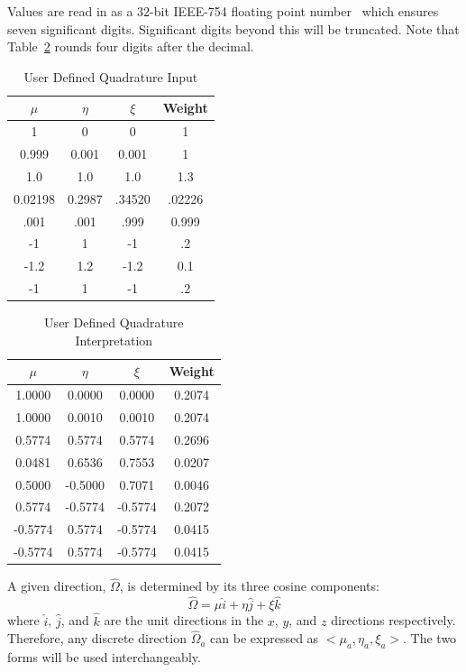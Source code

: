 Values are read in as a 32-bit IEEE-754 floating point number~\citep{ref:ieee754} which ensures seven significant digits. Significant digits beyond this will be truncated. Note that Table~\ref{tab:quad_interp} rounds four digits after the decimal.

\begin{table}[ht]
\caption{User Defined Quadrature Input}
\centering 
\begin{tabular}{c c c c}
\hline \hline   
$\mu$    & $\eta$ & $\xi$ & Weight\\ [0.5ex] 
\hline
1        & 0      & 0      & 1 \\
0.999    & 0.001  & 0.001  & 1 \\
1.0      & 1.0    & 1.0    & 1.3 \\
0.02198  & 0.2987 & .34520 & .02226 \\
.001     & .001   & .999   & 0.999 \\
-1       & 1      & -1     & .2 \\
-1.2     & 1.2    & -1.2   & 0.1 \\
-1        & 1     & -1     & .2 \\ [1ex]
\hline
\end{tabular}
\label{tab:quad_format}
\end{table}

\begin{table}[ht]
\caption{User Defined Quadrature Interpretation}
\centering 
\begin{tabular}{c c c c}
\hline \hline   
$\mu$    & $\eta$ & $\xi$ & Weight\\ [0.5ex] 
\hline
 1.0000  &  0.0000  &  0.0000  & 0.2074 \\
 1.0000  &  0.0010  &  0.0010  & 0.2074 \\
 0.5774  &  0.5774  &  0.5774  & 0.2696 \\
 0.0481  &  0.6536  &  0.7553  & 0.0207 \\
 0.5000  & -0.5000  &  0.7071  & 0.0046 \\
 0.5774  & -0.5774  & -0.5774  & 0.2072 \\
-0.5774  &  0.5774  & -0.5774  & 0.0415 \\
-0.5774  &  0.5774  & -0.5774  & 0.0415 \\ [1ex]
\hline
\end{tabular}
\label{tab:quad_interp}
\end{table}

A given direction, $\hat{\Omega}$, is determined by its three cosine components: 
\begin{equation} \label{eq:omega_cos}
\hat{\Omega} = \mu \hat{i} + \eta \hat{j} + \xi \hat{k}
\end{equation}
where $\hat{i}$, $\hat{j}$, and $\hat{k}$ are the unit directions in the $x$, $y$, and $z$ directions respectively. Therefore, any discrete direction $\hat{\Omega}_a$ can be expressed as $<\mu_a, \eta_a, \xi_a>$. The two forms will be used interchangeably.

